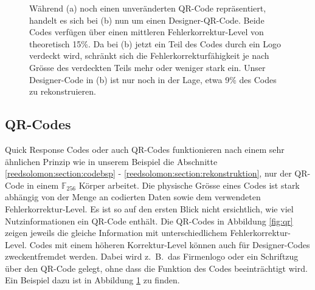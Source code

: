 \begin{figure}
	\centering
	\caption{Während (a) noch einen unveränderten QR-Code repräsentiert, handelt es sich bei (b) nun um einen Designer-QR-Code. Beide Codes verfügen über einen mittleren Fehlerkorrektur-Level von theoretisch 15\%. Da bei (b) jetzt ein Teil des Codes durch ein Logo verdeckt wird, schränkt sich die Fehlerkorrekturfähigkeit je nach Grösse des verdeckten Teils mehr oder weniger stark ein. Unser Designer-Code in (b) ist nur noch in der Lage, etwa 9\% des Codes zu rekonstruieren.}
	\label{fig:designqr}
\end{figure}

\subsection{QR-Codes}
%
Quick Response Codes oder auch QR-Codes funktionieren nach einem sehr ähnlichen Prinzip wie in unserem Beispiel die Abschnitte \ref{reedsolomon:section:codebsp} - \ref{reedsolomon:section:rekonstruktion}, nur der QR-Code in einem $\mathbb{F}_{256}$ Körper arbeitet.
Die physische Grösse eines Codes ist stark abhängig von der Menge an codierten Daten sowie dem verwendeten Fehlerkorrektur-Level.
Es ist so auf den ersten Blick nicht ersichtlich, wie viel Nutzinformationen ein QR-Code enthält.
Die QR-Codes in Abbildung \ref{fig:qr} zeigen jeweils die gleiche Information mit unterschiedlichem Fehlerkorrektur-Level.
Codes mit einem höheren Korrektur-Level können auch für Designer-Codes zweckentfremdet werden.
%
Dabei wird z.~B.~das Firmenlogo oder ein Schriftzug über den QR-Code gelegt, ohne dass die Funktion des Codes beeinträchtigt wird. Ein Beispiel dazu ist in Abbildung \ref{fig:designqr} zu finden. 

